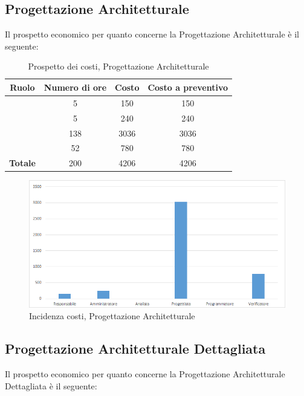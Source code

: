 \subsection{Progettazione Architetturale}
Il prospetto economico per quanto concerne la Progettazione Architetturale è il seguente:


\begin{table}[H]
	\begin{center}
		\begin{tabular}{|c|c|c|c|}
			\hline
			\textbf{Ruolo}	& \textbf{Numero di ore} & \textbf{Costo} & \textbf{Costo a preventivo} \\
			\hline
			\Res	&	5  &	150  &	150	\\
			\hline
			\Amm	&	5  &	240  &	240	\\
			\hline
			\Prog	&	138  &	3036  &	3036	\\
			\hline
			\Ver	&	52  &	780  &	780	\\
			\hline
			\textbf{Totale}  &	200 &	4206 &	4206	\\
			\hline
		\end{tabular}
	\end{center}
	\caption{Prospetto dei costi, Progettazione Architetturale }
\end{table}

\begin{figure}[H]
	\centering
	\includegraphics[scale=0.6]{img/8-2.png}
	\caption{Incidenza costi, Progettazione Architetturale}
\end{figure}

\subsection{Progettazione Architetturale Dettagliata}
Il prospetto economico per quanto concerne la Progettazione Architetturale Dettagliata è il seguente:


